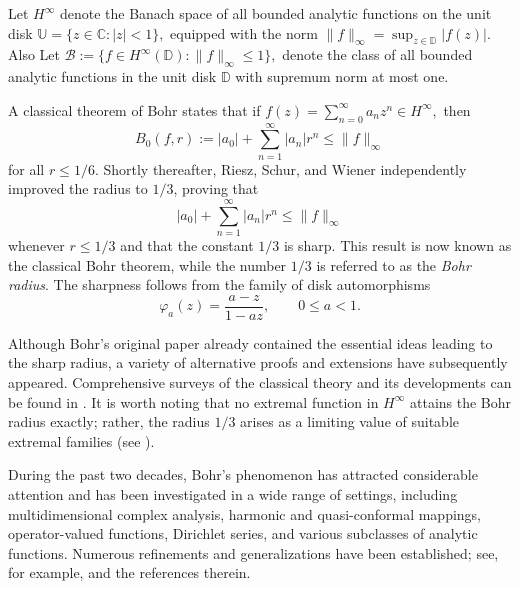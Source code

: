 \documentclass[11pt, reqno]{amsart}
\newtheorem*{theoD}{Theorem D}
\newtheorem*{cor A}{Corollary A}
\newtheorem*{cor B}{Corollary B}
\numberwithin{equation}{section}
\begin{document}
Let $H^\infty$ denote the Banach space of all bounded analytic functions on the unit disk
$\mathbb{U}=\{z\in\mathbb{C}:|z|<1\},$
equipped with the norm $\|f\|_\infty=\sup_{z\in\mathbb{D}}|f(z)|.$ Also Let $\mathcal{B}:=\{f\in H^\infty(\mathbb{D}): \|f\|_\infty\le 1\},$
denote the class of all bounded analytic functions in the unit disk $\mathbb{D}$ with supremum norm at most one.\\

\medskip

A classical theorem of Bohr \cite{Bohr1914} states that if $f(z)=\sum_{n=0}^{\infty}a_n z^n \in H^\infty,$
then
\[
B_0(f,r):=|a_0|+\sum_{n=1}^{\infty}|a_n|r^n
\leq \|f\|_\infty
\]
for all $r\leq 1/6$. Shortly thereafter, Riesz, Schur, and Wiener independently improved the radius to $1/3$, proving that
\[
|a_0|+\sum_{n=1}^{\infty}|a_n|r^n \leq \|f\|_\infty
\]
whenever $r\leq 1/3$ and that the constant $1/3$ is sharp. This result is now known as the classical Bohr theorem, while the number $1/3$ is referred to as the \emph{Bohr radius}. The sharpness follows from the family of disk automorphisms
\[
\varphi_a(z)=\frac{a-z}{1-az}, \qquad 0\le a<1.
\]

Although Bohr's original paper already contained the essential ideas leading to the sharp radius, a variety of alternative proofs and extensions have subsequently appeared. Comprehensive surveys of the classical theory and its developments can be found in \cite{AAP2017,GMR2018}. It is worth noting that no extremal function in $H^\infty$ attains the Bohr radius exactly; rather, the radius $1/3$ arises as a limiting value of suitable extremal families (see \cite{AKP2019,GMR2018,KP2017}).

During the past two decades, Bohr's phenomenon has attracted considerable attention and has been investigated in a wide range of settings, including multidimensional complex analysis, harmonic and quasi-conformal mappings, operator-valued functions, Dirichlet series, and various subclasses of analytic functions. Numerous refinements and generalizations have been established; see, for example, \cite{AA2013,BD2018,BB2004,KS2022,LLP2023, LL2020} and the references therein.

\end{document}
